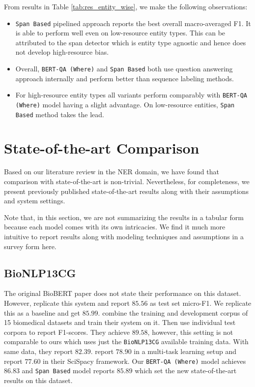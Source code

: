 From results in Table \ref{tab:res_entity_wise}, we make the following observations:
\begin{itemize}
    \item \texttt{Span Based} pipelined approach reports the best overall macro-averaged F1. It is able to perform well even on low-resource entity types. This can be attributed to the span detector which is entity type agnostic and hence does not develop high-resource bias.
    
    \item Overall, \texttt{BERT-QA (Where)} and \texttt{Span Based} both use question answering approach internally and perform better than sequence labeling methods. 
    
    \item For high-resource entity types all variants perform comparably with \texttt{BERT-QA (Where)} model having a slight advantage. On low-resource entities, \texttt{Span Based} method takes the lead.
\end{itemize}

\section{State-of-the-art Comparison}
\label{sec:sota_comparison}
Based on our literature review in the NER domain, we have found that comparison with state-of-the-art is non-trivial. Nevertheless, for completeness, we present previously published state-of-the-art results along with their assumptions and system settings. 

Note that, in this section, we are not summarizing the results in a tabular form because each model comes with its own intricacies. We find it much more intuitive to report results along with modeling techniques and assumptions in a survey form here.

\subsection{BioNLP13CG}
The original BioBERT paper\cite{lee2020biobert} does not state their performance on this dataset. However, \cite{banerjee2019knowledge} replicate this system and report $85.56$ as test set micro-F1. We replicate this as a baseline and get $85.99$. \cite{banerjee2019knowledge} combine the training and development corpus of 15 biomedical datasets and train their system on it. Then use individual test corpora to report F1-scores. They achieve $89.58$, however, this setting is not comparable to ours which uses just the \texttt{BioNLP13CG} available training data. With same data, they report $82.39$. \cite{crichton2017neural} report $78.90$ in a multi-task learning setup and \cite{neumann2019scispacy} report $77.60$ in their SciSpacy framework. Our \texttt{BERT-QA (Where)} model achieves $86.83$ and \texttt{Span Based} model reports $85.89$ which set the new state-of-the-art results on this dataset.

